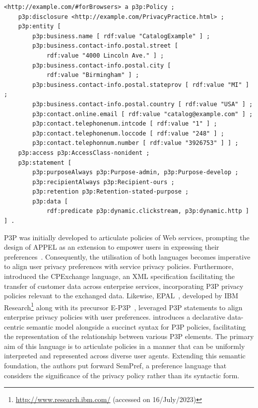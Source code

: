 \begin{listing}
\caption[P3P privacy policy.]{P3P policy extracted from Example 3.1 of the P3P specification~\citep{cranor_platform_2002}, which specifies the privacy policy of CatalogExample.}
\label{list:p3p_example}
\begin{verbatim}
<http://example.com/#forBrowsers> a p3p:Policy ;
    p3p:disclosure <http://example.com/PrivacyPractice.html> ;
    p3p:entity [
        p3p:business.name [ rdf:value "CatalogExample" ] ;
        p3p:business.contact-info.postal.street [
            rdf:value "4000 Lincoln Ave." ] ;
        p3p:business.contact-info.postal.city [
            rdf:value "Birmingham" ] ;
        p3p:business.contact-info.postal.stateprov [ rdf:value "MI" ] ;
        p3p:business.contact-info.postal.country [ rdf:value "USA" ] ;
        p3p:contact.online.email [ rdf:value "catalog@example.com" ] ;
        p3p:contact.telephonenum.intcode [ rdf:value "1" ] ;
        p3p:contact.telephonenum.loccode [ rdf:value "248" ] ;
        p3p:contact.telephonnum.number [ rdf:value "3926753" ] ] ;
    p3p:access p3p:AccessClass-nonident ;
    p3p:statement [
        p3p:purposeAlways p3p:Purpose-admin, p3p:Purpose-develop ;
        p3p:recipientAlways p3p:Recipient-ours ;
        p3p:retention p3p:Retention-stated-purpose ;
        p3p:data [
            rdf:predicate p3p:dynamic.clickstream, p3p:dynamic.http ] ] .
\end{verbatim}
\end{listing}

P3P was initially developed to articulate policies of Web services, prompting the design of APPEL as an extension to empower users in expressing their preferences~\citep{cranor_p3p_2002}.
Consequently, the utilisation of both languages becomes imperative to align user privacy preferences with service privacy policies.
Furthermore, \cite{bohrer_customer_2000} introduced the CPExchange language, an XML specification facilitating the transfer of customer data across enterprise services, incorporating P3P privacy policies relevant to the exchanged data.
Likewise, EPAL~\citep{ashley_enterprise_2003}, developed by IBM Research\footnote{\url{http://www.research.ibm.com/} (accessed on 16/July/2023)} along with its precursor E-P3P~\citep{ashley_e-p3p_2002}, leveraged P3P statements to align enterprise privacy policies with user preferences.
\cite{li_semantics-base_2006} introduces a declarative data-centric semantic model alongside a succinct syntax for P3P policies, facilitating the representation of the relationship between various P3P elements.
The primary aim of this language is to articulate policies in a manner that can be uniformly interpreted and represented across diverse user agents.
Extending this semantic foundation, the authors put forward SemPref, a preference language that considers the significance of the privacy policy rather than its syntactic form.

